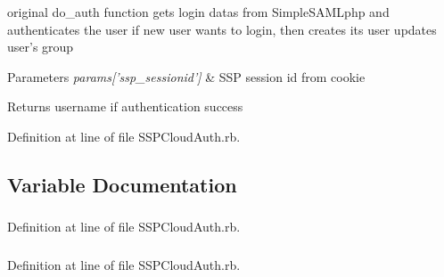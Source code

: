 original \-d\-o\_\-\-a\-u\-t\-h function gets login datas from \-S\-i\-m\-p\-l\-e\-S\-A\-M\-L\-p\-h\-p and authenticates the user if new user wants to login, then creates its user updates user's group 


\begin{DoxyParams}{Parameters}
{\em \-p\-a\-r\-a\-m\-s\mbox{[}\-'\-s\-s\-p\_\-\-s\-e\-s\-s\-i\-o\-n\-i\-d\-'\mbox{]}} & SSP session id from cookie \\
\hline
\end{DoxyParams}
\begin{DoxyReturn}{Returns}
username if authentication success 
\end{DoxyReturn}


Definition at line  of file \-S\-S\-P\-C\-l\-o\-u\-d\-A\-u\-t\-h\-.\-r\-b.



\subsection{Variable Documentation}
\hypertarget{namespaceSSPCloudAuth_a06a8ea6415274c55ae1cd8655249f471}{
\subsubsection[{\-s\-e\-s\-s\-i\-o\-n}]{}}
\label{namespaceSSPCloudAuth_a06a8ea6415274c55ae1cd8655249f471}


Definition at line  of file \-S\-S\-P\-C\-l\-o\-u\-d\-A\-u\-t\-h\-.\-r\-b.

\hypertarget{namespaceSSPCloudAuth_a12c3275ac266f990e2bde03b19e5368f}{
\subsubsection[{\-s\-e\-s\-s\-i\-o\-n\-i\-d}]{}}
\label{namespaceSSPCloudAuth_a12c3275ac266f990e2bde03b19e5368f}


Definition at line  of file \-S\-S\-P\-C\-l\-o\-u\-d\-A\-u\-t\-h\-.\-r\-b.

